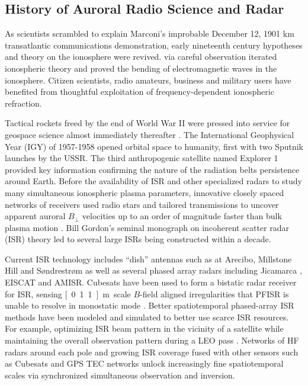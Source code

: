 \subsection{History of Auroral Radio Science and Radar}\label{sec:historyisr}
As scientists scrambled to explain Marconi's improbable December 12, 1901 \citep{ratcliffe1974,belrose2001} \unit[3500]{km} transatlantic communications demonstration, early nineteenth century hypotheses and theory \citep{gauss1839} on the ionosphere were revived.
\citet{appleton1925} via careful observation iterated ionospheric theory and proved the bending of electromagnetic waves in the ionosphere.
Citizen scientists, radio amateurs, business and military users have benefited from thoughtful exploitation of frequency-dependent ionospheric refraction.

Tactical rockets freed by the end of World War II were pressed into service for geospace science almost immediately thereafter \citep{schmerling1966}.
The International Geophysical Year (IGY) of 1957-1958 opened orbital space to humanity, first with two Sputnik launches by the USSR.
The third anthropogenic satellite named Explorer 1 provided key information confirming the nature of the radiation belts persistence around Earth.
Before the availability of ISR and other specialized radars to study many simultaneous ionospheric plasma parameters, innovative closely spaced networks of receivers used radio stars and tailored transmissions to uncover apparent auroral $B_\perp$ velocities up to an order of magnitude faster than bulk plasma motion \citep{briggs1954}.
Bill Gordon's seminal monograph \citep{gordon1958} on incoherent scatter radar (ISR) theory led to several large ISRs being constructed within a decade.

Current ISR technology includes ``dish'' antennas such as at Arecibo, Millstone Hill and Søndrestrøm as well as several phased array radars including Jicamarca \citep{hysell2013jica}, EISCAT and AMISR.
Cubesats have been used to form a bistatic radar receiver for ISR, sensing \unit[0.1..1]{m} scale $B$-field aligned irregularities that PFISR is unable to resolve in monostatic mode \citep{bahcivan2014,cutler2013rax}.
Better spatiotemporal phased-array ISR methods have been modeled and simulated to better use scarce ISR resources.
For example, optimizing ISR beam pattern in the vicinity of a satellite while maintaining the overall observation pattern during a LEO pass \citep{swobodathesis}.
Networks of HF radars around each pole \citep{chisham2007} and growing ISR coverage fused with other sensors such as Cubesats and GPS TEC networks \citep{semeter2016} unlock increasingly fine spatiotemporal scales via synchronized simultaneous observation and inversion.
